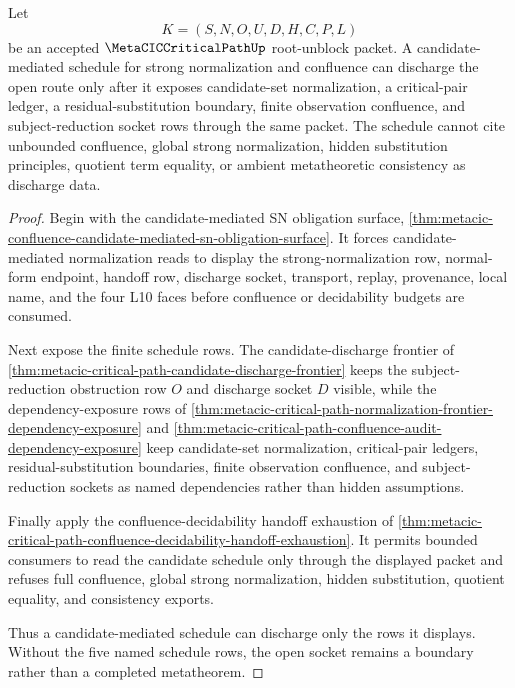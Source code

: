 \begin{theorem}
\label{thm:metacic-criticalpath-candidate-schedule-discharge}
Let
$$
K=(S,N,O,U,D,H,C,P,L)
$$
be an accepted $\MetaCICCriticalPathUp$ root-unblock packet. A candidate-mediated schedule for strong normalization and confluence can discharge the open route only after it exposes candidate-set normalization, a critical-pair ledger, a residual-substitution boundary, finite observation confluence, and subject-reduction socket rows through the same packet. The schedule cannot cite unbounded confluence, global strong normalization, hidden substitution principles, quotient term equality, or ambient metatheoretic consistency as discharge data.
\end{theorem}
\begin{proof}
Begin with the candidate-mediated SN obligation surface, \autoref{thm:metacic-confluence-candidate-mediated-sn-obligation-surface}. It forces candidate-mediated normalization reads to display the strong-normalization row, normal-form endpoint, handoff row, discharge socket, transport, replay, provenance, local name, and the four L10 faces before confluence or decidability budgets are consumed.

Next expose the finite schedule rows. The candidate-discharge frontier of \autoref{thm:metacic-critical-path-candidate-discharge-frontier} keeps the subject-reduction obstruction row $O$ and discharge socket $D$ visible, while the dependency-exposure rows of \autoref{thm:metacic-critical-path-normalization-frontier-dependency-exposure} and \autoref{thm:metacic-critical-path-confluence-audit-dependency-exposure} keep candidate-set normalization, critical-pair ledgers, residual-substitution boundaries, finite observation confluence, and subject-reduction sockets as named dependencies rather than hidden assumptions.

Finally apply the confluence-decidability handoff exhaustion of \autoref{thm:metacic-critical-path-confluence-decidability-handoff-exhaustion}. It permits bounded consumers to read the candidate schedule only through the displayed packet and refuses full confluence, global strong normalization, hidden substitution, quotient equality, and consistency exports.

Thus a candidate-mediated schedule can discharge only the rows it displays. Without the five named schedule rows, the open socket remains a boundary rather than a completed metatheorem.
\end{proof}

